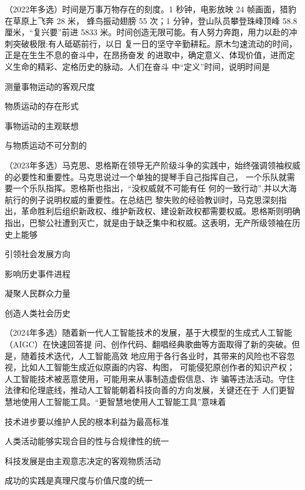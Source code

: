 \documentclass[lang=cn,newtx,10pt,scheme=chinese,pad,twocol]{zznote}
\begin{document}
\begin{example}	（2022年多选）时间是万事万物存在的刻度。1 秒钟，电影放映 24 帧画面，猎豹在草原上飞奔 28 米，
	蜂鸟振动翅膀 55 次；1 分钟，登山队员攀登珠峰顶峰 58.8 厘米，“复兴要”前进 5833
	米。时间创造无限可能。有人努力奔跑，用力以赴的冲刺突破极限:有人砥砺前行，以日
	复一日的坚守辛勤耕耘。原木匀速流动的时间，正是在生生不息的奋斗中，在昂扬奋发
	的进取中，确定意义、体现价值，进而定义生命的精彩、定格历史的脉动。人们在奋斗
	中“定义”时间，说明时间是

	\begin{choice}
		\item 测量事物运动的客观尺度
		\item 物质运动的存在形式
		\item 事物运动的主观联想
		\item 与物质运动不可分割的
	\end{choice}
\end{example}

\begin{example} （2023年多选）马克思、恩格斯在领导无产阶级斗争的实践中，始终强调领袖权威
	的必要性和重要性。马克思说过一个单独的提琴手自己指挥自己， 一个乐队就需要一个乐队指挥。恩格斯也指出，“没权威就不可能有任 何的一致行动”,并以大海航行的例子说明权威的重要性。在总结巴
	黎失败的经验教训时，马克思深刻指出，革命胜利后组织新政权、维护新政权、建设新政权都需要权威。恩格斯则明确指出，巴黎公社遭到灭亡，就是由于缺乏集中和权威。这表明，无产所级领袖在历史上能够
	\begin{choice}
		\item 引领社会发展方向
		\item 影响历史事件进程
		\item 凝聚人民群众力量
		\item 创造人类社会历史
	\end{choice}
\end{example}


\begin{example} （2024年多选）随着新一代人工智能技术的发展，基于大模型的生成式人工智能（AIGC）在快速回答提 问、创作代码、翻唱经典歌曲等方面取得了新的突破。但是，随着技术迭代，人工智能高效 地应用于各行各业时，其带来的风险也不容忽视，比如人工智能生成近似原画的内容、构图， 可能侵犯原创作者的知识产权；人工智能技术被恶意使用，可能用来从事制造虚假信息、诈 骗等违法活动。守住法律和伦理底线，推动人工智能朝着科技向善的方向发展，关键还在于 人们更智慧地使用人工智能工具。“更智慧地使用人工智能工具”意味着
	\begin{choice}
		\item 技术进步要以维护人民的根本利益为最高标准
		\item 人类活动能够实现合目的性与合规律性的统一
		\item 科技发展是由主观意志决定的客观物质活动
		\item 成功的实践是真理尺度与价值尺度的统一
	\end{choice}
\end{example}
\end{document}
